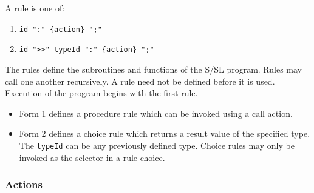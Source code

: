 A rule is one of:
\begin{enumerate}
\item {\tt id     ":"           \{action\} ";"}
\item {\tt id ">>"  typeId  ":" \{action\} ";"}
\end{enumerate}


The     rules  define  the  subroutines and functions of the
S/SL program.  Rules may call one  another  recursively.   A
rule  need  not  be defined before it is used.  Execution of
the program begins with the first rule.
\begin{itemize}
\item Form 1 defines a procedure rule which  can         be  invoked
using a call action.
\item Form 2 defines  a  choice rule which returns a result
value  of  the  specified  type.   The  {\tt typeId}    can  be  any
previously  defined  type.  Choice rules may only be invoked
as the selector in a rule choice.
\end{itemize}



\subsubsection{Actions}

